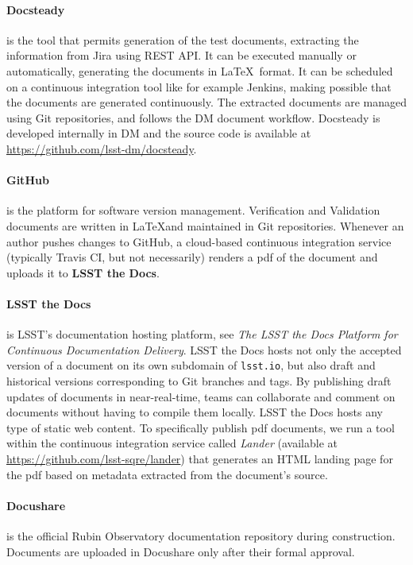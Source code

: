 \paragraph{Docsteady}
is the tool that permits generation of the test documents, extracting the information from Jira using REST API.
It can be executed manually or automatically, generating the documents in \LaTeX~format.
It can be scheduled on a continuous integration tool like for example Jenkins, making possible that 
the documents are generated continuously.
The extracted documents are managed using Git repositories, and follows the  DM document workflow.
Docsteady is developed internally in DM and the source code is available at \url{https://github.com/lsst-dm/docsteady}.

\paragraph{GitHub}
is the platform for software version management.
Verification and Validation documents are written in \LaTeX and maintained in Git repositories.
Whenever an author pushes changes to GitHub, a cloud-based continuous integration service (typically Travis CI, but
not necessarily) renders a pdf of the document and uploads it to \textbf{LSST the Docs}.

\paragraph{LSST the Docs}
is LSST's documentation hosting platform, see \textit{The LSST the Docs Platform for Continuous Documentation Delivery}\cite{SQR-006}. 
LSST the Docs hosts not only the accepted version of a document on its own subdomain of \texttt{lsst.io}, but also draft and
historical versions corresponding to Git branches and tags.
By publishing draft updates of documents in near-real-time, teams can collaborate and comment on documents without having to
compile them locally.
LSST the Docs hosts any type of static web content.
To specifically publish pdf documents, we run a tool within the continuous integration service called \textit{Lander}
(available at \url{https://github.com/lsst-sqre/lander})
that generates an HTML landing page for the pdf based on metadata extracted from the document's source.

\paragraph{Docushare}
is the official Rubin Observatory documentation repository during construction.
Documents are uploaded in Docushare only after their formal approval.


